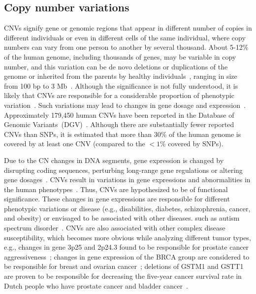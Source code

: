 \subsection{Copy number variations}
\label{sec:cnv_data}
CNVs signify gene or genomic regions that appear in different number of copies in different individuals or even in different cells of the same individual, where copy numbers can vary from one person to another by several thousand. About 5-12\% of the human genome, including thousands of genes, may be variable in copy number, and this variation can be de novo deletions or duplications of the genome or inherited from the parents by healthy individuals~\cite{ostrovnaya2010classification}, ranging in size from 100 bp to 3 Mb~\cite{zhang2006development}. Although the significance is not fully understood, it is likely that CNVs are responsible for a considerable proportion of phenotypic variation~\cite{ostrovnaya2010classification}. Such variations may lead to changes in gene dosage and expression~\cite{diskin2009copy}. Approximately 179,450 human CNVs have been reported in the Database of Genomic Variants~(DGV)~\cite{iafrate2004detection,zhang2006development}. Although there are substantially fewer reported CNVs than SNPs, it is estimated that more than 30\% of the human genome is covered by at least one CNV (compared to the $<1$\% covered by SNPs). 

\hspace*{3.5mm} Due to the CN changes in DNA segments, gene expression is changed by disrupting coding sequences, perturbing long-range gene regulations or altering gene dosages~\cite{37Yang}. CNVs result in variations in gene expressions and abnormalities in the human phenotypes~\cite{18Chen}. Thus, CNVs are hypothesized to be of functional significance. These changes in gene expressions are responsible for different phenotypic variations or disease (e.g., disabilities, diabetes, schizophrenia, cancer, and obesity) or envisaged to be associated with other diseases. such as autism spectrum disorder~\cite{38Buckland, 39Nguyen, 40McCarroll}. CNVs are also associated with other complex disease susceptibility, which becomes more obvious while analyzing different tumor types, e.g., changes in gene 3p25 and 2p24.3 found to be responsible for prostate cancer aggressiveness~\cite{43Liu, 44Thean}; changes in gene expression of the BRCA group are considered to be responsible for breast and ovarian cancer~\cite{45Petrij, 46Montagna}; deletions of GSTM1 and GSTT1 are proven to be responsible for decreasing the five-year cancer survival rate in Dutch people who have prostate cancer and bladder cancer~\cite{48Diskin, 31Park}.\\

